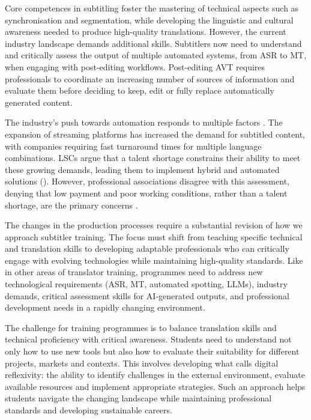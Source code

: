 \documentclass[output=paper]{langscibook}
\begin{document}
Core competences in subtitling foster the mastering of technical aspects such as synchronisation and segmentation, while developing the linguistic and cultural awareness needed to produce high-quality translations. However, the current industry landscape demands additional skills. Subtitlers now need to understand and critically assess the output of multiple automated systems, from ASR to MT, when engaging with post-editing workflows. Post-editing AVT requires professionals to coordinate an increasing number of sources of information and evaluate them before deciding to keep, edit or fully replace automatically generated content.

\largerpage
The industry’s push towards automation responds to multiple factors \citep{orrego-carmona2024placing}. The expansion of streaming platforms has increased the demand for subtitled content, with companies requiring fast turnaround times for multiple language combinations. LSCs argue that a talent shortage constrains their ability to meet these growing demands, leading them to implement hybrid and automated solutions (\citealt{iyuno2022simplified, marking2022iyuno}). However, professional associations disagree with this assessment, denying that low payment and poor working conditions, rather than a talent shortage, are the primary concerns \citep{AVTE2023}.

The changes in the production processes require a substantial revision of how we approach subtitler training. The focus must shift from teaching specific technical and translation skills to developing adaptable professionals who can critically engage with evolving technologies while maintaining high-quality standards. Like in other areas of translator training, programmes need to address new technological requirements (ASR, MT, automated spotting, LLMs), industry demands, critical assessment skills for AI-generated outputs, and professional development needs in a rapidly changing environment.

The challenge for training programmes is to balance translation skills and technical proficiency with critical awareness. Students need to understand not only how to use new tools but also how to evaluate their suitability for different projects, markets and contexts. This involves developing what \citet{tipton2024routledge} calls digital reflexivity: the ability to identify challenges in the external environment, evaluate available resources and implement appropriate strategies. Such an approach helps students navigate the changing landscape while maintaining professional standards and developing sustainable careers.
\end{document}

